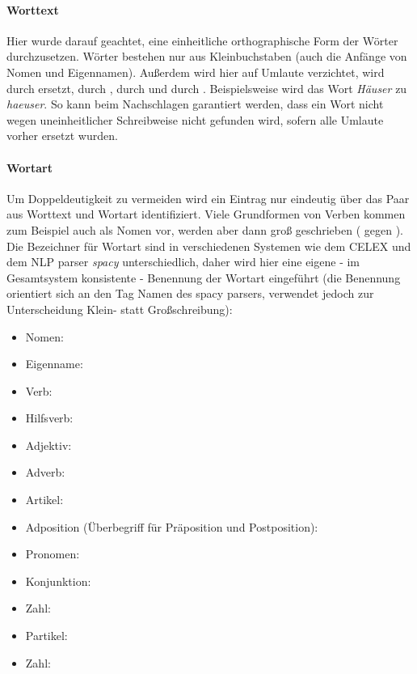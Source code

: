 \paragraph{Worttext}
Hier wurde darauf geachtet, eine einheitliche orthographische Form der Wörter durchzusetzen. Wörter bestehen nur aus Kleinbuchstaben (auch die Anfänge von Nomen und Eigennamen). Außerdem wird hier auf Umlaute verzichtet,  wird durch  ersetzt,  durch ,  durch  und  durch . Beispielsweise wird das Wort \textit{Häuser} zu \textit{haeuser}. So kann beim Nachschlagen garantiert werden, dass ein Wort nicht wegen uneinheitlicher Schreibweise nicht gefunden wird, sofern alle Umlaute vorher ersetzt wurden.

\paragraph{Wortart}
Um Doppeldeutigkeit zu vermeiden wird ein Eintrag nur eindeutig über das Paar aus Worttext und Wortart identifiziert. Viele Grundformen von Verben kommen zum Beispiel auch als Nomen vor, werden aber dann groß geschrieben ( gegen ). Die Bezeichner für Wortart sind in verschiedenen Systemen wie dem CELEX und dem NLP parser \textit{spacy} unterschiedlich, daher wird hier eine eigene - im Gesamtsystem konsistente - Benennung der Wortart eingeführt (die Benennung orientiert sich an den Tag Namen des spacy parsers, verwendet jedoch zur Unterscheidung Klein- statt Großschreibung):
\begin{itemize}
	\item Nomen: 
	\item Eigenname: 
	\item Verb: 
	\item Hilfsverb: 
	\item Adjektiv: 
	\item Adverb: 
	\item Artikel: 
	\item Adposition (Überbegriff für Präposition und Postposition): 
	\item Pronomen: 
	\item Konjunktion: 
	\item Zahl: 
	\item Partikel: 
	\item Zahl: 
\end{itemize}

